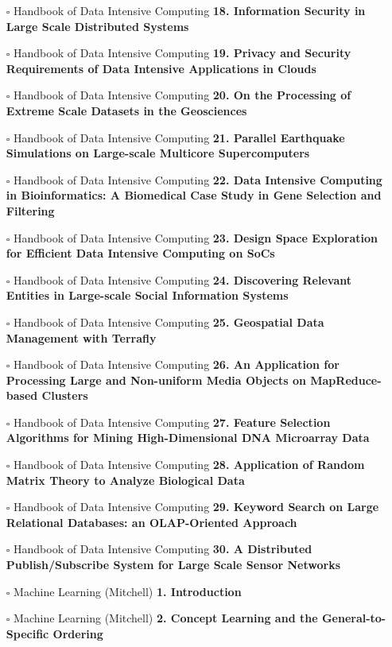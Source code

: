 \documentclass[a4, landscape, 12pt]{article}
\newcommand{\checkbox}{$\square$}%
\begin{document}
\begin{itemize}
{}
\item [\checkbox]  Handbook of Data Intensive Computing \textbf{ 18. Information Security in Large Scale Distributed Systems
}
\item [\checkbox]  Handbook of Data Intensive Computing \textbf{ 19. Privacy and Security Requirements of Data Intensive Applications in Clouds
}
\item [\checkbox]  Handbook of Data Intensive Computing \textbf{ 20. On the Processing of Extreme Scale Datasets in the Geosciences
}
\item [\checkbox]  Handbook of Data Intensive Computing \textbf{ 21. Parallel Earthquake Simulations on Large-scale Multicore Supercomputers
}
\item [\checkbox]  Handbook of Data Intensive Computing \textbf{ 22. Data Intensive Computing in Bioinformatics: A Biomedical Case Study in Gene Selection and Filtering
}
\item [\checkbox]  Handbook of Data Intensive Computing \textbf{ 23. Design Space Exploration for Efficient Data Intensive Computing on SoCs
}
\item [\checkbox]  Handbook of Data Intensive Computing \textbf{ 24. Discovering Relevant Entities in Large-scale Social Information Systems
}
\item [\checkbox]  Handbook of Data Intensive Computing \textbf{ 25. Geospatial Data Management with Terrafly
}
\item [\checkbox]  Handbook of Data Intensive Computing \textbf{ 26. An Application for Processing Large and Non-uniform Media Objects on MapReduce-based Clusters
}
\item [\checkbox]  Handbook of Data Intensive Computing \textbf{ 27. Feature Selection Algorithms for Mining High-Dimensional DNA Microarray Data
}
\item [\checkbox]  Handbook of Data Intensive Computing \textbf{ 28. Application of Random Matrix Theory to Analyze Biological Data
}
\item [\checkbox]  Handbook of Data Intensive Computing \textbf{ 29. Keyword Search on Large Relational Databases: an OLAP-Oriented Approach
}
\item [\checkbox]  Handbook of Data Intensive Computing \textbf{ 30. A Distributed Publish/Subscribe System for Large Scale Sensor Networks
}
\item [\checkbox]  Machine Learning (Mitchell) \textbf{ 1. Introduction
}
\item [\checkbox]  Machine Learning (Mitchell) \textbf{ 2. Concept Learning and the General-to-Specific Ordering
}
\end{itemize}
\end{document}
